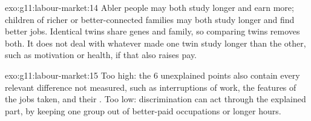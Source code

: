 \begin{solution}{exo:g11:labour-market:14}
Abler people may both study longer and earn more; children of richer or better-connected families may both study longer and find better jobs. Identical twins share genes
and family, so comparing twins removes both. It does not deal with whatever made one twin study longer than the other, such as motivation or health, if that also raises pay.
\end{solution}

\begin{solution}{exo:g11:labour-market:15}
Too high: the 6 unexplained points also contain every relevant difference not measured, such as interruptions of work, the features of the jobs taken, and their
. Too low: discrimination can act through the explained part, by keeping one group out of better-paid occupations or longer hours.
\end{solution}

